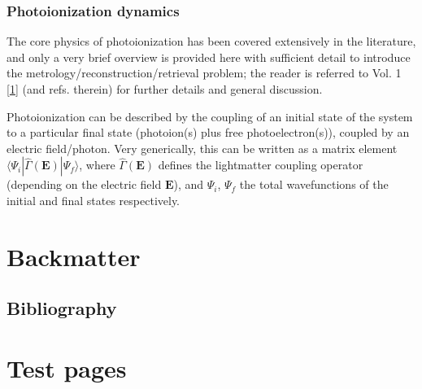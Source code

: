 \documentclass[letterpaper,10pt,english]{jupyterBook}
\begin{document}
\section{Photoionization dynamics}
\label{\detokenize{part1/theory_101122:photoionization-dynamics}}\label{\detokenize{part1/theory_101122:sec-dynamics-intro}}
\sphinxAtStartPar
The core physics of photoionization has been covered extensively in the literature, and only a very brief overview is provided here with sufficient detail to introduce the metrology/reconstruction/retrieval problem; the reader is referred to Vol. 1 {[}\hyperlink{cite.backmatter/bibliography:id52}{1}{]} (and refs. therein) for further details and general discussion.

\sphinxAtStartPar
Photoionization can be described by the coupling of an initial state of the system to a particular final state (photoion(s) plus free photoelectron(s)), coupled by an electric field/photon. Very generically, this can be written as a matrix element \(\langle\Psi_i|\hat{\Gamma}(\boldsymbol{\mathbf{E}})|\Psi_f\rangle\), where \(\hat{\Gamma}(\boldsymbol{\mathbf{E}})\) defines the light\sphinxhyphen{}matter coupling operator (depending on the electric field \(\boldsymbol{\mathbf{E}}\)), and \(\Psi_i\), \(\Psi_f\) the total wavefunctions of the initial and final states respectively.

\sphinxstepscope


\part{Backmatter}

\sphinxstepscope


\chapter{Bibliography}
\label{\detokenize{backmatter/bibliography:bibliography}}\label{\detokenize{backmatter/bibliography::doc}}\label{\detokenize{backmatter/bibliography:id1}}
\sphinxstepscope


\part{Test pages}
\end{document}

